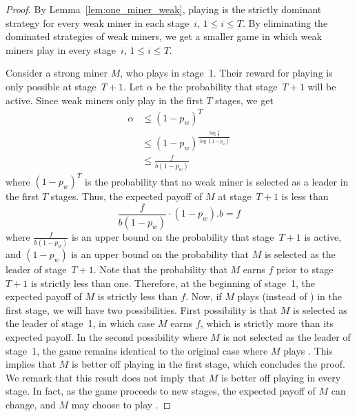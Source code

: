 \begin{proof}
  By Lemma~\ref{lem:one_miner_weak}, playing  is the strictly dominant strategy for every weak miner in
  each stage~$i$, $1\leq i \leq T$. By eliminating the dominated strategies of weak miners, we get a smaller game in which weak miners play  in every stage~$i$, $1\leq i \leq T$.
  
  Consider a strong miner $M$, who plays \follow{} in stage~1. Their reward for playing \follow{} is only possible at stage~$T+1$. Let $\alpha$ be the probability that stage~$T+1$ will be active. Since weak miners only play  in the first $T$ stages, we get 
  \[
  \begin{split}
    \alpha
    &\leq (1-p_w)^T\\
    &\leq (1-p_w)^{\frac{\log \frac{f}{b}}{\log (1-p_w)}}\\
    &\leq \frac{f}{b(1-p_w)}
  \end{split}
  \]
  where $ (1-p_w)^T$ is the probability that no weak miner is selected as a leader in the first $T$ stages. Thus, the expected payoff of $M$ at stage~$T+1$ is less than 
  \[
    \frac{f}{b(1-p_w)}\cdot (1-p_w).b=f
  \]
  where $ \frac{f}{b(1-p_w)}$ is an upper bound on the probability that stage~$T+1$ is active, and $(1-p_w)$ is an upper bound on the probability that $M$ is selected as the leader of stage~$T+1$. Note that the probability that $M$ earns $f$ prior to stage~$T+1$ is strictly less than one. Therefore, at the beginning of stage~1, the expected payoff of $M$ is strictly less than $f$. Now, if $M$ plays  (instead of \follow{}) in the first stage, we will have two possibilities. First possibility is that $M$ is selected as the leader of stage~1, in which case $M$ earns $f$, 
  which is strictly more than its expected payoff. In the second possibility where $M$ is not selected as the leader of stage~1, the game remains identical to the original case where $M$ plays \follow{}. This implies that $M$ is better off playing  in the first stage, which concludes the proof. We remark that this result does not imply that $M$ is better off playing  in every stage. In fact, as the game proceeds to new stages, the expected payoff of $M$ can change, and  $M$ may choose to play \follow{}.
  
\end{proof}

